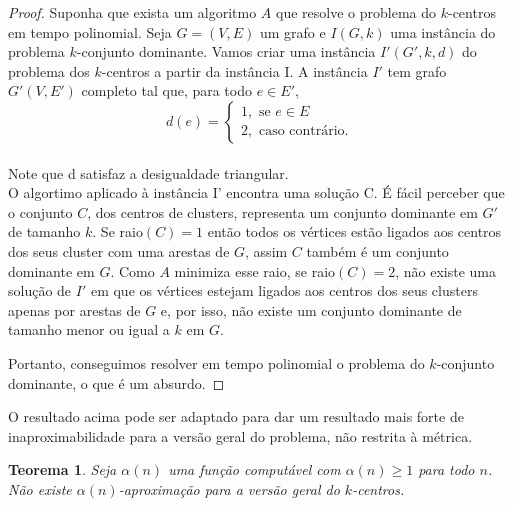 \documentclass[12pt]{article}
\newtheorem{theorem}{Teorema}[section]
\begin{document}
\begin{proof}
    Suponha que exista um algoritmo $A$ que resolve o problema do $k$-centros em tempo polinomial. Seja $G = (V,E)$ um grafo e $I(G,k)$ uma instância do problema $k$-conjunto dominante. Vamos criar uma instância $I'(G',k,d)$ do problema dos $k$-centros a partir da instância I. A instância $I'$ tem grafo $G'(V,E')$ completo tal que, para todo $e \in E'$, \\
    \[
    d(e) = \begin{cases}
            1, \text{ se } e \in E \\
            2, \text{ caso contrário.} 
            \end{cases}\]\\
    Note que d satisfaz a desigualdade triangular.\\
    O algortimo aplicado à instância I' encontra uma solução C. É fácil perceber que o conjunto $C$, dos centros de clusters, representa um conjunto dominante em $G'$ de tamanho $k$. Se raio$(C)=1$ então todos os vértices estão ligados aos centros dos seus cluster com uma arestas de $G$, assim $C$ também é um conjunto dominante em $G$. Como $A$ minimiza esse raio, se raio$(C)=2$, não existe uma solução de $I'$ em que os vértices estejam ligados aos centros dos seus clusters apenas por arestas de $G$ e, por isso, não existe um conjunto dominante de tamanho menor ou igual a $k$ em $G$.

    Portanto, conseguimos resolver em tempo polinomial o problema do $k$-conjunto dominante, o que é um absurdo.
\end{proof}

O resultado acima pode ser adaptado para dar um resultado mais forte de inaproximabilidade para a versão geral do problema, não restrita à métrica.
\begin{theorem}
    Seja $\alpha(n)$ uma função computável com $\alpha(n)\geq 1$ para todo $n$. Não existe $\alpha(n)$-aproximação para a versão geral do $k$-centros.
\end{theorem}
\end{document}
